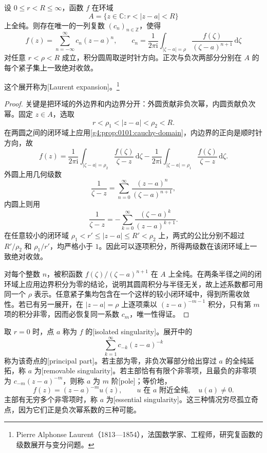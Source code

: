 \begin{theorem}[Laurent 展开]\label{g4:thm:0102:laurent}
	设 \(0\leq r<R\leq\infty\)，函数 \(f\) 在环域
	\[
		A=\{z\in\mathbb C:r<|z-a|<R\}
	\]
	上全纯。则存在唯一的一列复数 \((c_n)_{n\in\mathbb Z}\)，使得
	\[
		f(z)=\sum_{n=-\infty}^{\infty}c_n(z-a)^n,
		\qquad
		c_n=\frac{1}{2\pi\mathrm{i}}
		\int_{|\zeta-a|=\rho}\frac{f(\zeta)}{(\zeta-a)^{n+1}}\,\mathrm{d}\zeta
	\]
	对任意 \(r<\rho<R\) 成立，积分圆周取逆时针方向。正次与负次两部分分别在 \(A\) 的每个紧子集上一致绝对收敛。
\end{theorem}
这个展开称为[Laurent expansion]。\footnote{Pierre Alphonse Laurent（1813—1854），法国数学家、工程师，研究复函数的级数展开与变分问题。}
\begin{proof}
	关键是把环域的外边界和内边界分开：外圆贡献非负次幂，内圆贡献负次幂。固定 \(z\in A\)，选取
	\[
		r<\rho_1<|z-a|<\rho_2<R.
	\]
	在两圆之间的闭环域上应用\cref{g4:prop:0101:cauchy-domain}，内边界的正向是顺时针方向，故
	\[
		f(z)=\frac{1}{2\pi\mathrm{i}}
		\int_{|\zeta-a|=\rho_2}\frac{f(\zeta)}{\zeta-z}\,\mathrm{d}\zeta
		-\frac{1}{2\pi\mathrm{i}}
		\int_{|\zeta-a|=\rho_1}\frac{f(\zeta)}{\zeta-z}\,\mathrm{d}\zeta.
	\]
	外圆上用几何级数
	\[
		\frac{1}{\zeta-z}
		=\sum_{n=0}^{\infty}\frac{(z-a)^n}{(\zeta-a)^{n+1}},
	\]
	内圆上则用
	\[
		\frac{1}{\zeta-z}
		=-\sum_{k=0}^{\infty}\frac{(\zeta-a)^k}{(z-a)^{k+1}}.
	\]
	在任意较小的闭环域 \(\rho_1<r'\leq|z-a|\leq R'<\rho_2\) 上，两式的公比分别不超过 \(R'/\rho_2\) 和 \(\rho_1/r'\)，均严格小于 \(1\)。因此可以逐项积分，所得两级数在该闭环域上一致绝对收敛。

	对每个整数 \(n\)，被积函数 \(f(\zeta)/(\zeta-a)^{n+1}\) 在 \(A\) 上全纯。在两条半径之间的闭环域上应用边界积分为零的结论，说明其圆周积分与半径无关，故上述系数都可用同一个 \(\rho\) 表示。任意紧子集均包含在一个这样的较小闭环域中，得到所需收敛性。若已有另一展开，在 \(|z-a|=\rho\) 上逐项乘以 \((z-a)^{-m-1}\) 积分，只有第 \(m\) 项的积分非零，因而必恢复同一系数 \(c_m\)，唯一性得证。
\end{proof}

取 \(r=0\) 时，点 \(a\) 称为 \(f\) 的[isolated singularity]。展开中的
\[
	\sum_{k=1}^{\infty}c_{-k}(z-a)^{-k}
\]
称为该奇点的[principal part]。若主部为零，非负次幂部分给出穿过 \(a\) 的全纯延拓，称 \(a\) 为[removable singularity]。若主部恰有有限个非零项，且最负的非零项为 \(c_{-m}(z-a)^{-m}\)，则称 \(a\) 为 \(m\) 阶[pole]；等价地，
\[
	f(z)=(z-a)^{-m}u(z),\qquad u\text{ 在 }a\text{ 附近全纯},\quad u(a)\neq0.
\]
主部有无穷多个非零项时，称 \(a\) 为[essential singularity]。这三种情况穷尽孤立奇点，因为它们正是负次幂系数的三种可能。

